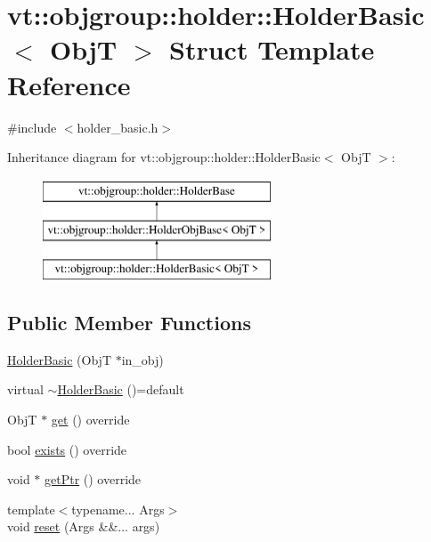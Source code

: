 \hypertarget{structvt_1_1objgroup_1_1holder_1_1_holder_basic}{}\section{vt\+:\+:objgroup\+:\+:holder\+:\+:Holder\+Basic$<$ ObjT $>$ Struct Template Reference}
\label{structvt_1_1objgroup_1_1holder_1_1_holder_basic}


{\ttfamily \#include $<$holder\+\_\+basic.\+h$>$}

Inheritance diagram for vt\+:\+:objgroup\+:\+:holder\+:\+:Holder\+Basic$<$ ObjT $>$\+:\begin{figure}[H]
\begin{center}
\leavevmode
\includegraphics[height=3.000000cm]{structvt_1_1objgroup_1_1holder_1_1_holder_basic}
\end{center}
\end{figure}
\subsection*{Public Member Functions}
\begin{DoxyCompactItemize}
\item 
\hyperlink{structvt_1_1objgroup_1_1holder_1_1_holder_basic_a0e74a9b5eb928c8d9cdaf81dd0994d7b}{Holder\+Basic} (ObjT $\ast$in\+\_\+obj)
\item 
virtual \hyperlink{structvt_1_1objgroup_1_1holder_1_1_holder_basic_a7446aae8de5ccb8e9cceee2143ca29ea}{$\sim$\+Holder\+Basic} ()=default
\item 
ObjT $\ast$ \hyperlink{structvt_1_1objgroup_1_1holder_1_1_holder_basic_af1d605b64e5f9d77d4b291c402133f3f}{get} () override
\item 
bool \hyperlink{structvt_1_1objgroup_1_1holder_1_1_holder_basic_ab52459a275afea84f6650d206fe5b3dc}{exists} () override
\item 
void $\ast$ \hyperlink{structvt_1_1objgroup_1_1holder_1_1_holder_basic_a2a8962345709045e6d2c465b17362885}{get\+Ptr} () override
\item 
{\footnotesize template$<$typename... Args$>$ }\\void \hyperlink{structvt_1_1objgroup_1_1holder_1_1_holder_basic_ae0e03732280c6c1cf44f9ff8f24426c2}{reset} (Args \&\&... args)
\end{DoxyCompactItemize}
